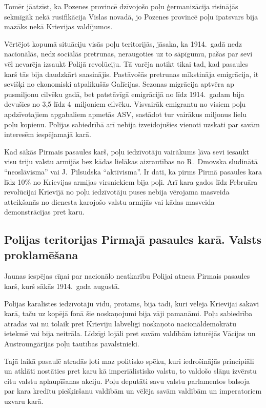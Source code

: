 \documentclass[twoside,a5paper,12pt,fleqn,openany]{extbook}
\begin{document}
Tomēr jāatzīst, ka Pozenes provincē dzīvojošo poļu ģermanizācija risinājās sekmīgāk nekā rusifikācija Vislas novadā, jo Pozenes provincē poļu īpatsvars bija mazāks nekā Krievijas valdījumos.

Vērtējot kopumā situāciju visās poļu teritorijās, jāsaka, ka 1914.~gadā nedz nacionālās, nedz sociālās pretrunas, neraugoties uz to sāpīgumu, pašas par sevi vēl nevarēja izsaukt Polijā revolūciju. Tā varēja notikt tikai tad, kad pasaules karš tās bija daudzkārt saasinājis. Pastāvošās pretrunas mīkstināja emigrācija, it sevišķi no ekonomiski atpalikušās Galīcijas. Sezonas migrācija aptvēra ap pusmiljonu cilvēku gadā, bet patstāvīgā emigrācijā no līdz 1914.~gadam bija devušies no 3,5 līdz 4~miljoniem cilvēku. Visvairāk emigrantu no visiem poļu apdzīvotajiem apgabaliem apmetās ASV, sastādot tur vairākus miljonus lielu poļu kopienu. Polijas sabiedrībā arī nebija izveidojušies vienoti uzskati par savām interesēm iespējamajā karā.

Kad sākās Pirmais pasaules karš, poļu iedzīvotāju vairākums ļāva sevi iesaukt visu triju valstu armijās bez kādas lielākas aizrautības no R.~Dmovska sludinātā ``neoslāvisma'' vai J.~Pilsudska ``aktīvisma''. Ir dati, ka pirms Pirmā pasaules kara līdz 10\% no Krievijas armijas virsniekiem bija poļi. Arī kara gados līdz Februāra revolūcijai Krievijā no poļu iedzīvotāju puses nebija vērojama masveida atteikšanās no dienesta karojošo valstu armijās vai kādas masveida demonstrācijas pret karu.

\subsection{Polijas teritorijas Pirmajā pasaules karā. Valsts proklamēšana}

Jaunas iespējas cīņai par nacionālo neatkarību Polijai atnesa Pirmais pasaules karš, kurš sākās 1914.~gada augustā.

Polijas karalistes iedzīvotāju vidū, protams, bija tādi, kuri vēlēja Krievijai sakāvi karā, taču uz kopējā fonā šie noskaņojumi bija vāji pamanāmi. Poļu sabiedrība atradās vai nu tolaik pret Krieviju labvēlīgi noskaņoto nacionāldemokrātu ietekmē vai bija neitrāla. Līdzīgi lojāli pret savām valdībām izturējās Vācijas un Austroungārijas poļu tautības pavalstnieki.

Tajā laikā pasaulē atradās ļoti maz politisko spēku, kuri iedrošinājās principiāli un atklāti nostāties pret karu kā imperiālistisko valstu, to valdošo slāņu izvērstu citu valstu aplaupīšanas akciju. Poļu deputāti savu valstu parlamentos balsoja par kara kredītu piešķiršanu valdībām un vēlēja savām valdībām un imperatoriem uzvaru karā.
\end{document}

